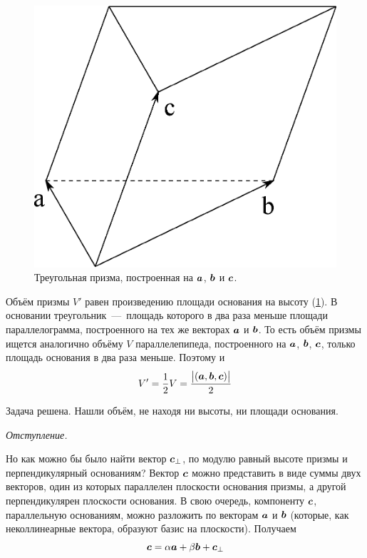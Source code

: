 \documentclass[a4paper,12pt]{article}
\begin{document}
  \begin{solution}
    \begin{figure}[h]
      \centering
      
      \includegraphics[width=0.5\columnwidth]{triangular-prism}
      
      \caption{Треугольная призма, построенная на $\boldsymbol a$, $\boldsymbol b$ и $\boldsymbol c$.}
      \label{fig:triangular-prism}
    \end{figure}
    
    Объём призмы $V'$ равен произведению площади основания на высоту (\ref{fig:triangular-prism}).
    В основании треугольник~---~площадь которого в два раза меньше площади параллелограмма, построенного на тех же векторах $\boldsymbol a$ и $\boldsymbol b$.
    То есть объём призмы ищется аналогично объёму $V$ параллелепипеда, построенного на $\boldsymbol a$, $\boldsymbol b$, $\boldsymbol c$, только площадь основания в два раза меньше.
    Поэтому и
    \[
      V' = \frac{1}{2} V = \frac{\bigl|(\boldsymbol a, \boldsymbol b, \boldsymbol c)\bigr|}{2}
    \]
    
    Задача решена.
    Нашли объём, не находя ни высоты, ни площади основания.
    
    \bigskip
    
    \emph{Отступление.}
    
    Но как можно бы было найти вектор $\boldsymbol c_{\perp}$, по модулю равный высоте призмы и перпендикулярный основаниям?
    Вектор $\boldsymbol c$ можно представить в виде суммы двух векторов, один из которых параллелен плоскости основания призмы, а другой перпендикулярен плоскости основания.
    В свою очередь, компоненту $\boldsymbol c$, параллельную основаниям, можно разложить по векторам $\boldsymbol a$ и $\boldsymbol b$ (которые, как неколлинеарные вектора, образуют базис на плоскости).
    Получаем
    \[
      \boldsymbol c = \alpha \boldsymbol a + \beta \boldsymbol b + \boldsymbol c_{\perp}
    \]


\end{solution}
\end{document}
